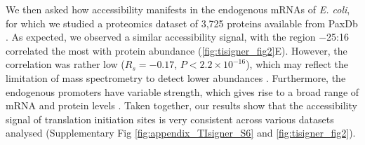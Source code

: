 We then asked how accessibility manifests in the endogenous mRNAs of \textit{E. coli}, for which we studied a proteomics dataset of 3,725 proteins available from PaxDb \cite{Wang2015-ky}. As expected, we observed a similar accessibility signal, with the region −25:16 correlated the most with protein abundance (\ref{fig:tisigner_fig2}E). However, the correlation was rather low ($R_s=−0.17$, $P<2.2 \times 10^{-16}$), which may reflect the limitation of mass spectrometry to detect lower abundances \cite{Tabb2009-ek,Nilsson2010-ol}. Furthermore, the endogenous promoters have variable strength, which gives rise to a broad range of mRNA and protein levels \cite{Deuschle1986-oz,Delvigne2017-vm}. Taken together, our results show that the accessibility signal of translation initiation sites is very consistent across various datasets analysed (Supplementary Fig \ref{fig:appendix_TIsigner_S6} and \ref{fig:tisigner_fig2}).


